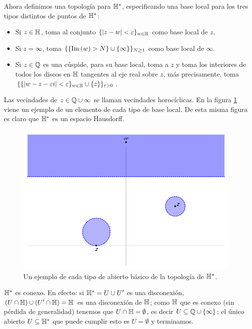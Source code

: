 \documentclass[../../tesis_maestria]{subfiles}
\begin{document}
Ahora definimos una topolog\'ia para $\mathbb{H}^*$, especificando una base
local para los tres tipos distintos de puntos de $\mathbb{H}^*$:
\begin{itemize}
\item Si $z\in\mathbb{H}$, toma al conjunto $\{\left| z-w \right|<\varepsilon\}_{w\in\mathbb{H}}$ como base local de $z$.
\item Si $z=\infty$, toma $\{\{\mathrm{Im}\left( w \right)>N\}\cup\{\infty\}\}_{N\geq1}$ como base local de $\infty$.
\item Si $z\in\mathbb{Q}$ es una c\'uspide, para su base local, toma a $z$ y toma los interiores de todos
  los discos en $\mathbb{H}$ tangentes al eje real sobre $z$, m\'as precisamente, toma
  $\{\{\left| w-z-\varepsilon i \right|<\varepsilon\}_{w\in\mathbb{H}}\cup\{z\}\}_{\varepsilon>0}$.
\end{itemize}
Las vecindades de $z\in\mathbb{Q}\cup\infty$ se llaman vecindades horoc\'iclicas. En la figura
\ref{fig:topologiaH} viene un ejemplo de un elemento de cada tipo de base local.
De esta misma figura es claro que $\mathbb{H}^*$ es un espacio Hausdorff.
\begin{figure}[h]%
  \centering
  \includegraphics[scale=0.35]{figuras/topologiaH}
  \caption{Un ejemplo de cada tipo de abierto b\'asico de la topolog\'ia de $\mathbb{H}^*$.}
  \label{fig:topologiaH}
\end{figure}%

\begin{nota}
  $\mathbb{H}^*$ es conexo. En efecto: si $\mathbb{H}^*=U\cup U'$ es una disconexi\'on,
  $(U\cap\mathbb{H})\cup(U'\cap\mathbb{H})=\mathbb{H}$ es una disconexi\'on de $\mathbb{H}$; como $\mathbb{H}$ que es conexo
  (sin p\'erdida de generalidad) tenemos que $U\cap\mathbb{H}=\emptyset$, es decir
  $U\subseteq\mathbb{Q}\cup\{\infty\}$; el \'unico abierto $U\subseteq\mathbb{H}^*$ que puede cumplir
  esto es $U=\emptyset$ y terminamos.
\end{nota}
\end{document}
